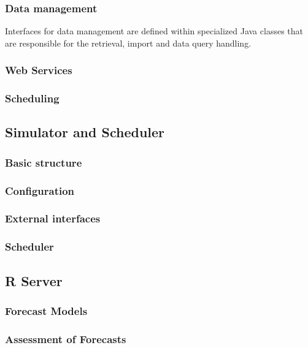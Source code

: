 \subsubsection{Data management}

Interfaces for data management are defined within specialized Java classes that are responsible for the retrieval, import and data query handling. 

\subsubsection{Web Services}

\subsubsection{Scheduling}


\subsection{Simulator and Scheduler}

\subsubsection{Basic structure}

\subsubsection{Configuration}

\subsubsection{External interfaces}

\subsubsection{Scheduler}


\subsection{R Server}

\subsubsection{Forecast Models}

\subsubsection{Assessment of Forecasts}


